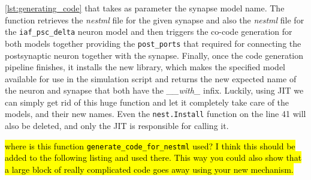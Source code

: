 \autoref{lst:generating_code} that takes as parameter the synapse model name. The function retrieves the \emph{nestml} file for the given synapse and also the \emph{nestml} file for the \texttt{iaf\_psc\_delta} neuron model and then triggers the co-code generation for both models together providing the \texttt{post\_ports} that required for connecting the postsynaptic neuron together with the synapse. Finally, once the code generation pipeline finishes, it installs the new library, which makes the specified model available for use in the simulation script and returns the new expected name of the neuron and synapse that both have the \emph{\_\_with\_} infix. Luckily, using JIT we can simply get rid of this huge function and let it completely take care of the models, and their new names. Even the \texttt{nest.Install} function on the line 41 will also be deleted, and only the JIT is responsible for calling it.

\hl{where is this function \texttt{generate\_code\_for\_nestml} used? I think this should be added to the following listing and used there. This way you could also show that a large block of really complicated code goes away using your new mechanism.}

